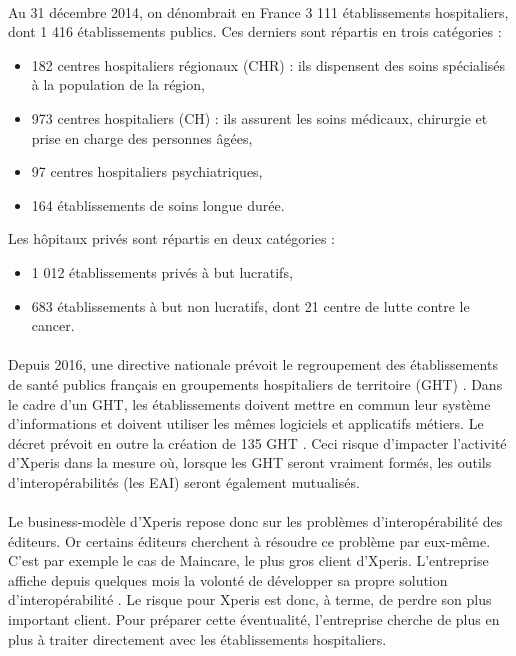 			\paragraph{}%
			Au 31 décembre 2014, on dénombrait en France 3 111 établissements hospitaliers, 
			dont 1 416 établissements publics. Ces derniers sont répartis en trois catégories 
			\citep{drees_panoramas_2016} :
			\begin{itemize}
				\item 182 centres hospitaliers régionaux (CHR) : ils dispensent des soins 
				spécialisés à la population de la région,
				\item 973 centres hospitaliers (CH) : ils assurent les soins médicaux, 
				chirurgie et prise en charge des personnes âgées,
				\item 97 centres hospitaliers psychiatriques,
				\item 164 établissements de soins longue durée.
			\end{itemize}
			Les hôpitaux privés sont répartis en deux catégories :
			\begin{itemize}
				\item 1 012 établissements privés à but lucratifs,
				\item 683 établissements à but non lucratifs, dont 21 centre de lutte contre 
				le cancer.
			\end{itemize}
			
			\paragraph{}%
			Depuis 2016, une directive nationale prévoit le regroupement des établissements de 
			santé publics français en groupements hospitaliers de territoire (GHT) 
			\citep{valls_decret_2016}. Dans le cadre d'un GHT, les établissements doivent mettre 
			en commun leur système d'informations et doivent utiliser les mêmes logiciels et 
			applicatifs métiers. Le décret prévoit en outre la création de 135 GHT  
			\citep{touraine_marisol_2016}. Ceci risque d'impacter l'activité d'Xperis dans la 
			mesure où, lorsque les GHT seront vraiment formés, les outils d'interopérabilités 
			(les EAI) seront également mutualisés.
			
			\paragraph{}%
			Le business-modèle d'Xperis repose donc sur les problèmes d'interopérabilité des 
			éditeurs. Or certains éditeurs cherchent à résoudre ce problème par eux-même. C'est 
			par exemple le cas de Maincare, le plus gros client d'Xperis. L'entreprise affiche 
			depuis quelques mois la volonté de développer sa propre solution d'interopérabilité 
			\citep{perochon_e-sante:_2016}. Le risque pour Xperis est donc, à terme, de perdre son 
			plus important client. Pour préparer cette éventualité, l'entreprise cherche de plus 
			en plus à traiter directement avec les établissements hospitaliers.
			
